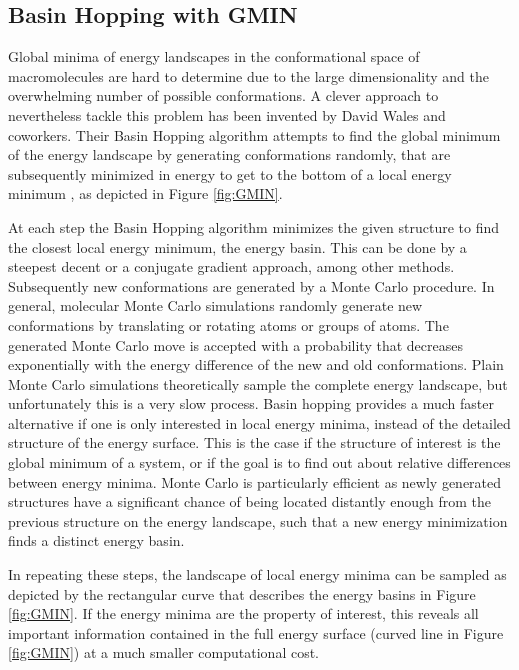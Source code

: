 \documentclass[english, a4paper, 12pt, titlepage, draft]{article}
\begin{document}

\subsection{Basin Hopping with GMIN}

Global minima of energy landscapes in the conformational space of macromolecules are hard to determine due to the large dimensionality and the overwhelming number of possible conformations.
A clever approach to nevertheless tackle this problem has been invented by David Wales and coworkers.
Their Basin Hopping algorithm attempts to find the global minimum of the energy landscape by generating conformations randomly, that are subsequently minimized in energy to get to the bottom of a local energy minimum \cite{basinHopping}, as depicted in Figure \ref{fig:GMIN}.

At each step the Basin Hopping algorithm minimizes the given structure to find the closest local energy minimum, the energy basin.
This can be done by a steepest decent or a conjugate gradient approach, among other methods.
Subsequently new conformations are generated by a Monte Carlo procedure. 
In general, molecular Monte Carlo simulations randomly generate new conformations by translating or rotating atoms or groups of atoms.
The generated Monte Carlo move is accepted with a probability that decreases exponentially with the energy difference of the new and old conformations.
Plain Monte Carlo simulations theoretically sample the complete energy landscape, but unfortunately this is a very slow process.
Basin hopping provides a much faster alternative if one is only interested in local energy minima, instead of the detailed structure of the energy surface.
This is the case if the structure of interest is the global minimum of a system, or if the goal is to find out about relative differences between energy minima.
Monte Carlo is particularly efficient as newly generated structures have a significant chance of being located distantly enough from the previous structure on the energy landscape, such that a new energy minimization finds a distinct energy basin.

In repeating these steps, the landscape of local energy minima can be sampled as depicted by the rectangular curve that describes the energy basins in Figure \ref{fig:GMIN}.
If the energy minima are the property of interest, this reveals all important information contained in the full energy surface (curved line in Figure \ref{fig:GMIN}) at a much smaller computational cost.
\end{document}
